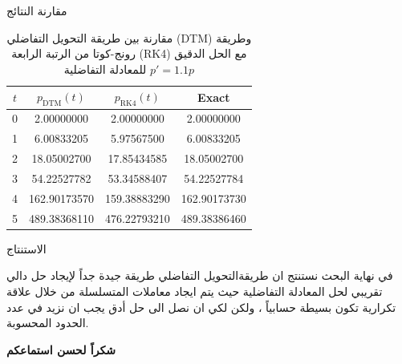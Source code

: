 		\begin{frame}{مقارنة النتائج}
			\begin{table}[h]
				\centering
				\renewcommand{\arraystretch}{1.5}
				\begin{english}
					\centering
					\begin{tabular}{|c|c|c|c|}
					\hline
					$t$ & $p_{\text{DTM}}(t)$ & $p_{\text{RK4}}(t)$ & Exact \\ 
					\hline
					0 & 2.00000000 & 2.00000000 & 2.00000000 \\ 
					1 & 6.00833205 & 5.97567500 & 6.00833205 \\ 
					2 & 18.05002700 & 17.85434585 & 18.05002700 \\ 
					3 & 54.22527782 & 53.34588407 & 54.22527784 \\ 
					4 & 162.90173570 & 159.38883290 & 162.90173730 \\ 
					5 & 489.38368110 & 476.22793210 & 489.38386460 \\ 
					\hline
				\end{tabular}
				\end{english}
				\caption{\centering مقارنة بين طريقة التحويل التفاضلي (DTM) وطريقة رونج-كوتا من الرتبة الرابعة (RK4) مع الحل الدقيق للمعادلة التفاضلية $p'=1.1p$}
			\end{table}
		\end{frame}
		
		\begin{frame}{الاستنتاج}\doublespacing
			
			في نهاية البحث نستنتج ان طريقةالتحويل التفاضلي طريقة جيدة جداً لإيجاد حل دالي تقريبي لحل المعادلة التفاضلية حيث يتم ايجاد معاملات المتسلسلة من خلال علاقة تكرارية تكون بسيطة حسابياً ، ولكن لكي ان نصل الى حل أدق يجب ان نزيد في عدد الحدود المحسوبة.
		\end{frame}
		
		\begin{frame}
			\Huge\centering
			\textbf{شكراً لحسن استماعكم}
		\end{frame}
